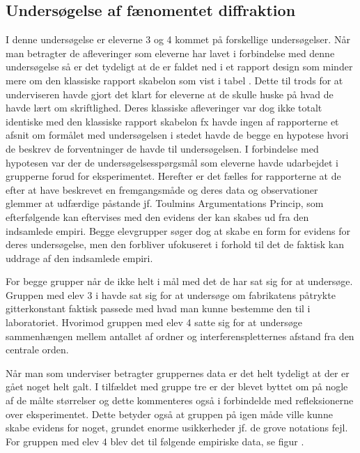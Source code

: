 \subsection*{Undersøgelse af fænomentet diffraktion}
I denne undersøgelse er eleverne 3 og 4 kommet på forskellige undersøgelser. Når man betragter de afleveringer som eleverne har lavet i forbindelse med denne undersøgelse så er det tydeligt at de er faldet ned i et rapport design som minder mere om den klassiske rapport skabelon som vist i tabel . Dette til trods for at underviseren havde gjort det klart for eleverne at de skulle huske på hvad de havde lært om skriftlighed. Deres klassiske afleveringer var dog ikke totalt identiske med den klassiske rapport skabelon fx havde ingen af rapporterne et afsnit om formålet med undersøgelsen i stedet havde de begge en hypotese hvori de beskrev de forventninger de havde til undersøgelsen. I forbindelse med hypotesen var der de undersøgelsesspørgsmål som eleverne havde udarbejdet i grupperne forud for eksperimentet. Herefter er det fælles for rapporterne at de efter at have beskrevet en fremgangsmåde og deres data og observationer glemmer at udfærdige påstande jf. Toulmins Argumentations Princip, som efterfølgende kan eftervises med den evidens der kan skabes ud fra den indsamlede empiri. Begge elevgrupper søger dog at skabe en form for evidens for deres undersøgelse, men den forbliver ufokuseret i forhold til det de faktisk kan uddrage af den indsamlede empiri.

For begge grupper når de ikke helt i mål med det de har sat sig for at undersøge. Gruppen med elev 3 i havde sat sig for at undersøge om fabrikatens påtrykte gitterkonstant faktisk passede med hvad man kunne bestemme den til i laboratoriet. Hvorimod gruppen med elev 4 satte sig for at undersøge sammenhængen mellem antallet af ordner og interferenspletternes afstand fra den centrale orden. 

Når man som underviser betragter gruppernes data er det helt tydeligt at der er gået noget helt galt. I tilfældet med gruppe tre er der blevet byttet om på nogle af de målte størrelser og dette kommenteres også i forbindelde med refleksionerne over eksperimentet. Dette betyder også at gruppen på igen måde ville kunne skabe evidens for noget, grundet enorme usikkerheder jf. de grove notations fejl. For gruppen med elev 4 blev det til følgende empiriske data, se figur .

